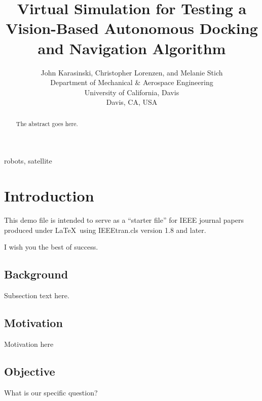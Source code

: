 \documentclass[journal, 10pt]{IEEEtran}
\begin{document}
\title{Virtual Simulation for Testing a Vision-Based Autonomous Docking and Navigation Algorithm}
%
%
\author{John Karasinski, Christopher Lorenzen, and Melanie Stich\\Department of Mechanical \& Aerospace Engineering\\University of California, Davis\\Davis, CA, USA }


\maketitle

\begin{abstract}
The abstract goes here.
\end{abstract}

\begin{IEEEkeywords}
robots, satellite
\end{IEEEkeywords}


\section{Introduction}

This demo file is intended to serve as a ``starter file''
for IEEE journal papers produced under \LaTeX\ using
IEEEtran.cls version 1.8 and later.

I wish you the best of success.

\subsection{Background}
Subsection text here.

\subsection{Motivation}
Motivation here

\subsection{Objective}
What is our specific question?
\end{document}
